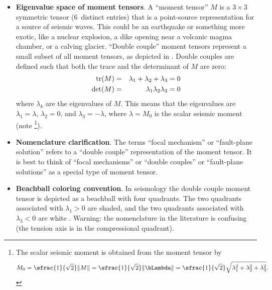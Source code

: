 \documentclass[11pt,titlepage,fleqn]{article}
\newcommand{\Mmat}{M}
\begin{document}
\begin{spacing}{1.0}
\begin{itemize}
\item {\bf Eigenvalue space of moment tensors}. A ``moment tensor'' $\Mmat$ is a $3 \times 3$ symmetric tensor (6~distinct entries) that is a point-source representation for a source of seismic waves. This could be an earthquake or something more exotic, like a nuclear explosion, a dike opening near a volcanic magma chamber, or a calving glacier. ``Double couple'' moment tensors represent a small subset of all moment tensors, as depicted in . Double couples are defined such that both the trace and the determinant of $\Mmat$ are zero:
%
\begin{eqnarray*}
{\rm tr}(\Mmat) &=& \lambda_1 + \lambda_2 + \lambda_3 = 0
\\
\det(\Mmat) &=& \lambda_1 \lambda_2 \lambda_3 = 0
\end{eqnarray*}
%
where $\lambda_k$ are the eigenvalues of $\Mmat$. This means that the eigenvalues are $\lambda_1 = \lambda$, $\lambda_2 = 0$, and $\lambda_3 = -\lambda$, where $\lambda = M_0$ is the scalar seismic moment (note \footnote{The scalar seismic moment is obtained from the moment tensor by
%
\begin{equation}
M_0 = \sfrac{1}{\sqrt{2}} \| \Mmat \|
= \sfrac{1}{\sqrt{2}} \| \bLambda \|
= \sfrac{1}{\sqrt{2}} \sqrt{\lambda_1^2 + \lambda_2^2 + \lambda_3^2}.
\end{equation}
}).

\item {\bf Nomenclature clarification}. 
The terms ``focal mechanism'' or ``fault-plane solution'' refers to a ``double couple'' representation of the moment tensor. It is best to think of ``focal mechanisms'' or ``double couples'' or ``fault-plane solutions'' as a special type of moment tensor.

\item {\bf Beachball coloring convention}. 
In seismology the double couple moment tensor is depicted as a beachball with four quadrants. The two quadrants associated with \mbox{$\lambda_1 > 0$} are shaded, and the two quadrants associated with \mbox{$\lambda_3 < 0$} are white \citep[][p.~257]{ShearerE2} \citep[][p.~224]{SteinWysession}. Warning: the nomenclature in the literature is confusing (\eg the tension axis is in the compressional quadrant).

\end{itemize}

\end{spacing}

\end{document}
